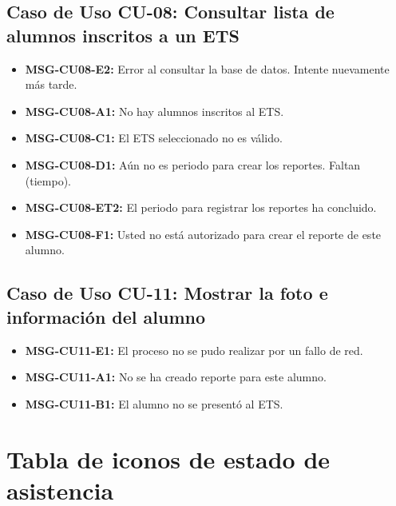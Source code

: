 \subsection{Caso de Uso CU-08: Consultar lista de alumnos inscritos a un ETS}
\begin{itemize}
	\item \textbf{\label{msg:CU08-E2}MSG-CU08-E2:} Error al consultar la base de datos. Intente nuevamente más tarde.
	\item \textbf{\label{msg:CU08-A1}MSG-CU08-A1:} No hay alumnos inscritos al ETS.
	\item \textbf{\label{msg:CU08-C1}MSG-CU08-C1:} El ETS seleccionado no es válido.
	\item \textbf{\label{msg:CU08-D1}MSG-CU08-D1:} Aún no es periodo para crear los reportes. Faltan (tiempo).
	\item \textbf{\label{msg:CU08-ET2}MSG-CU08-ET2:} El periodo para registrar los reportes ha concluido.
	\item \textbf{\label{msg:CU08-F1}MSG-CU08-F1:} Usted no está autorizado para crear el reporte de este alumno.
\end{itemize}

\subsection{Caso de Uso CU-11: Mostrar la foto e información del alumno}
\begin{itemize}
	\item \textbf{\label{msg:CU11-E1}MSG-CU11-E1:} El proceso no se pudo realizar por un fallo de red.
	\item \textbf{\label{msg:CU11-A1}MSG-CU11-A1:} No se ha creado reporte para este alumno.
	\item \textbf{\label{msg:CU11-B1}MSG-CU11-B1:} El alumno no se presentó al ETS.
\end{itemize}

\newpage

\section{Tabla de iconos de estado de asistencia}
\label{sec:tablaIconosAsistencia}

